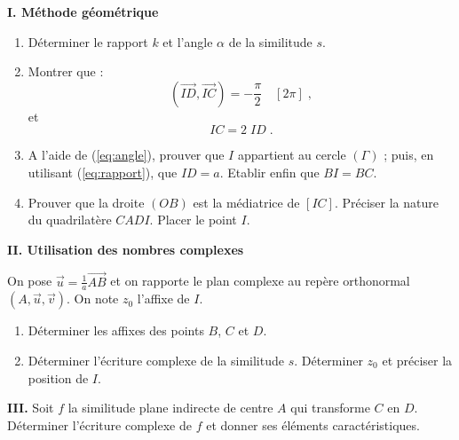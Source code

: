 \begin{exo}
\begin{description}
                  \textbf{I. M\'ethode g\'eom\'etrique}
                  
                  \begin{enumerate}
                        \item D\'eterminer le rapport $k$ et l'angle $\alpha$ de la similitude $s$. 
                        \item Montrer que : 
                              \begin{equation} \label{eq:angle}
                                    (\overrightarrow{ID}, \overrightarrow{IC}) = -\frac{\pi}{2} \quad [2 \pi] \;,
                              \end{equation}
                              et
                              \begin{equation} \label{eq:rapport}
                                    IC = 2 \; ID \;.
                              \end{equation}
                        \item A l'aide de (\ref{eq:angle}), prouver que $I$ appartient au cercle $(\Gamma)$ ; 
                              puis, en utilisant (\ref{eq:rapport}), que $ID = a$.
                              Etablir enfin que $BI = BC$.
                        \item Prouver que la droite $(OB)$ est la m\'ediatrice de $[IC]$.
                              Pr\'eciser la nature du quadrilat\`ere $CADI$. Placer le point $I$.
                  \end{enumerate}
                  
                  \textbf{II. Utilisation des nombres complexes}
                  
                  On pose $\vec{u} = \frac{1}{a} \overrightarrow{AB}$ et on rapporte le 
                  plan complexe au rep\`ere orthonormal $(A, \vec{u}, \vec{v})$.
                  On note $z_0$ l'affixe de $I$.
                  \begin{enumerate}
                        \item D\'eterminer les affixes des points $B$, $C$ et $D$.
                        \item D\'eterminer l'\'ecriture complexe de la similitude $s$.
                              D\'eterminer $z_0$ et pr\'eciser la position de $I$.
                  \end{enumerate}
                  
                  \textbf{III.} 
                        Soit $f$ la similitude plane indirecte de centre $A$ qui transforme $C$ en $D$.       
                        D\'eterminer l'\'ecriture complexe de $f$ et donner ses \'el\'ements caract\'eristiques.
      \end{description}
\end{exo}

